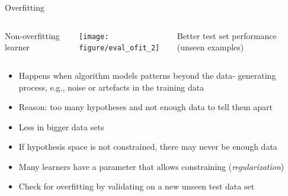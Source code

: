 \begin{vbframe}{Overfitting}
\begin{columns}[T,onlytextwidth]
Non-overfitting learner \\
\vspace{0.5cm}
\begin{knitrout}\scriptsize
{}\color{fgcolor}

{\centering \texttt{[image: figure/eval\_ofit\_2]} 

}



\end{knitrout}
Better test set performance (unseen examples)
\end{columns}


\framebreak


\begin{itemize}
  \item Happens when algorithm models patterns beyond the data- generating process,
    e.g., noise or artefacts in the training data
  \item Reason: too many hypotheses and not enough data to tell them apart
  \item Less in bigger data sets
  \item If hypothesis space is not constrained, there may never be enough data
  \item Many learners have a parameter that allows constraining (\textit{regularization})
  \item Check for overfitting by validating on a new unseen test data set
\end{itemize}

\end{vbframe}




